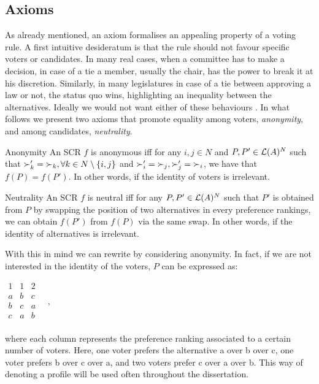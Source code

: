 \subsection{Axioms}
As already mentioned, an axiom formalises an appealing property of a voting rule.
A first intuitive desideratum is that the rule should not favour specific voters or candidates.
In many real cases, when a committee has to make a decision, in case of a tie a member, usually the chair, has the power to break it at his discretion.
Similarly, in many legislatures in case of a tie between approving a law or not, the status quo wins, highlighting an inequality between the alternatives.
Ideally we would not want either of these behaviours . In what follows we present two axioms that promote equality among voters, \textit{anonymity}, and among candidates, \textit{neutrality}. 

	\begin{genthm}{Anonymity}
	An \acs{SCR} $f$ is anonymous iff for any $i,j \in N$ and $P,P'\in\mathcal{L}(A)^{N}$ such that $\mathbin{\succ'_k}=\mathbin{\succ_k}, \forall k \in {N \setminus\{i,j\}}$ and $\mathbin{\succ'_i}=\mathbin{\succ_j}, \mathbin{\succ'_j}=\mathbin{\succ_i}$, we have that $f(P)=f(P')$. In other words, if the identity of voters is irrelevant.
	\end{genthm}

	\begin{genthm}{Neutrality}
	An \acs{SCR} $f$ is neutral iff for any $P,P'\in\mathcal{L}(A)^{N}$ such that $P'$ is obtained from $P$ by swapping the position of two alternatives in every preference rankings, we can obtain $f(P')$ from $f(P)$ via the same swap. In other words, if the identity of alternatives is irrelevant.	
	\end{genthm}

	\begin{example}
		\label{ex:anonymousprofile}
		With this in mind we can rewrite  by considering anonymity. In fact, if we are not interested in the identity of the voters, $P$ can be expressed as:
		\begin{center}
			$
			\begin{array}{ccc}
				1 & 1 & 2 \\
				a &	b & c \\
				b &	c & a \\
				c &	a & b \\
			\end{array} \quad, 
			$
		\end{center}
		where each column represents the preference ranking associated to a certain number of voters. Here, one voter prefers the alternative a over b over c, one voter prefers b over c over a, and two voters prefer c over a over b. 
		This way of denoting a profile will be used often throughout the dissertation.
	\end{example}

